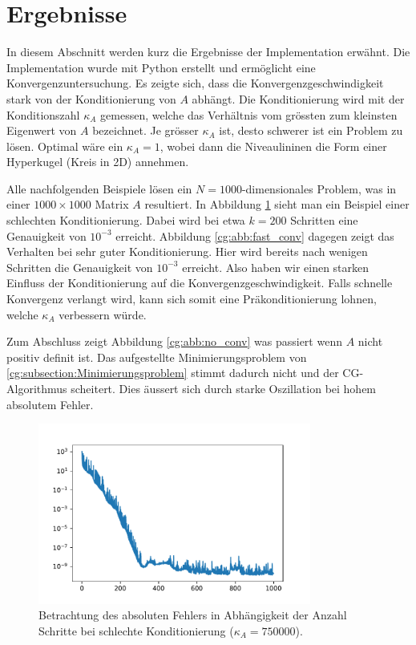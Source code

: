 \section{Ergebnisse}
\label{cg:section:ergebnisse}

In diesem Abschnitt werden kurz die Ergebnisse der Implementation erwähnt.
Die Implementation wurde mit Python erstellt und ermöglicht eine Konvergenzuntersuchung.
Es zeigte sich, dass die Konvergenzgeschwindigkeit stark von der Konditionierung von $A$ abhängt.
Die Konditionierung wird mit der Konditionszahl $\kappa_A$ gemessen, welche das Verhältnis vom grössten zum kleinsten Eigenwert von $A$ bezeichnet.
Je grösser $\kappa_A$ ist, desto schwerer ist ein Problem zu lösen.
Optimal wäre ein $\kappa_A = 1$, wobei dann die Niveaulininen die Form einer Hyperkugel (Kreis in 2D) annehmen.

Alle nachfolgenden Beispiele lösen ein $N=1000$-dimensionales Problem, was in einer $1000 \times 1000$ Matrix $A$ resultiert.
In Abbildung \ref{cg:abb:slow_conv} sieht man ein Beispiel einer schlechten Konditionierung.
Dabei wird bei etwa $k=200$ Schritten eine Genauigkeit von $10^{-3}$ erreicht.
Abbildung \ref{cg:abb:fast_conv} dagegen zeigt das Verhalten bei sehr guter Konditionierung.
Hier wird bereits nach wenigen Schritten die Genauigkeit von $10^{-3}$ erreicht.
Also haben wir einen starken Einfluss der Konditionierung auf die Konvergenzgeschwindigkeit.
Falls schnelle Konvergenz verlangt wird, kann sich somit eine Präkonditionierung lohnen, welche $\kappa_A$ verbessern würde.

Zum Abschluss zeigt Abbildung \ref{cg:abb:no_conv} was passiert wenn $A$ nicht positiv definit ist.
Das aufgestellte Minimierungsproblem von \ref{cg:subsection:Minimierungsproblem} stimmt dadurch nicht und der CG-Algorithmus scheitert.
Dies äussert sich durch starke Oszillation bei hohem absolutem Fehler.

\begin{figure}	
	\centering
	\includegraphics[width=0.8\textwidth]{papers/cg/images/convergence_k_750000}
	\caption{Betrachtung des absoluten Fehlers in Abhängigkeit der Anzahl Schritte bei schlechte Konditionierung ($\kappa_A=750000$).}
	\label{cg:abb:slow_conv}
\end{figure}


